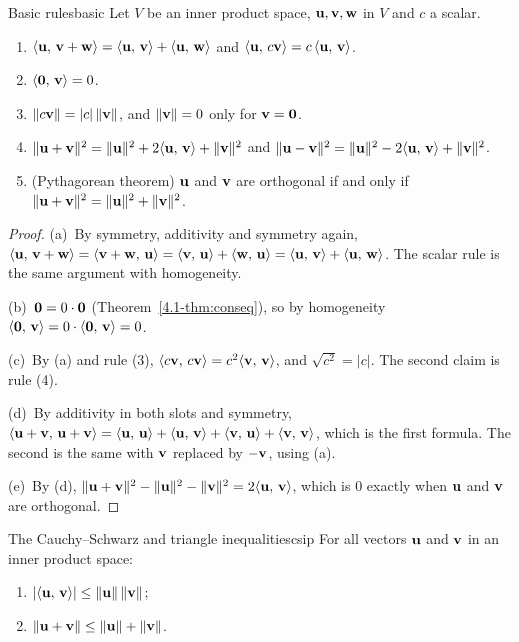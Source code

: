 \documentclass[11pt]{article}
\begin{document}
\begin{thm}{Basic rules}{basic}
Let $V$ be an inner product space, $\mathbf{u},\mathbf{v},\mathbf{w}$ in $V$ and $c$ a scalar.
\begin{enumerate}[label=(\alph*),itemsep=1pt]
  \item $\langle \mathbf{u},\,\mathbf{v}+\mathbf{w}\rangle=\langle \mathbf{u},\,\mathbf{v}\rangle+\langle \mathbf{u},\,\mathbf{w}\rangle$ and $\langle \mathbf{u},\,c\mathbf{v}\rangle=c\,\langle \mathbf{u},\,\mathbf{v}\rangle$.
  \item $\langle \mathbf{0},\,\mathbf{v}\rangle=0$.
  \item $\lVert c\mathbf{v}\rVert=|c|\,\lVert\mathbf{v}\rVert$, and $\lVert\mathbf{v}\rVert=0$ only for $\mathbf{v}=\mathbf{0}$.
  \item $\lVert\mathbf{u}+\mathbf{v}\rVert^2=\lVert\mathbf{u}\rVert^2+2\langle \mathbf{u},\,\mathbf{v}\rangle+\lVert\mathbf{v}\rVert^2$ and $\lVert\mathbf{u}-\mathbf{v}\rVert^2=\lVert\mathbf{u}\rVert^2-2\langle \mathbf{u},\,\mathbf{v}\rangle+\lVert\mathbf{v}\rVert^2$.
  \item (Pythagorean theorem) $\mathbf{u}$ and $\mathbf{v}$ are orthogonal if and only if $\lVert\mathbf{u}+\mathbf{v}\rVert^2=\lVert\mathbf{u}\rVert^2+\lVert\mathbf{v}\rVert^2$.
\end{enumerate}
\end{thm}

\begin{proof}
(a)~By symmetry, additivity and symmetry again, $\langle \mathbf{u},\,\mathbf{v}+\mathbf{w}\rangle=\langle \mathbf{v}+\mathbf{w},\,\mathbf{u}\rangle=\langle \mathbf{v},\,\mathbf{u}\rangle+\langle \mathbf{w},\,\mathbf{u}\rangle=\langle \mathbf{u},\,\mathbf{v}\rangle+\langle \mathbf{u},\,\mathbf{w}\rangle$. The scalar rule is the same argument with homogeneity.

(b)~$\mathbf{0}=0\cdot\mathbf{0}$ (Theorem~\ref{4.1-thm:conseq}), so by homogeneity $\langle \mathbf{0},\,\mathbf{v}\rangle=0\cdot\langle \mathbf{0},\,\mathbf{v}\rangle=0$.

(c)~By (a) and rule (3), $\langle c\mathbf{v},\,c\mathbf{v}\rangle=c^2\langle \mathbf{v},\,\mathbf{v}\rangle$, and $\sqrt{c^2}=|c|$. The second claim is rule (4).

(d)~By additivity in both slots and symmetry, $\langle \mathbf{u}+\mathbf{v},\,\mathbf{u}+\mathbf{v}\rangle=\langle \mathbf{u},\,\mathbf{u}\rangle+\langle \mathbf{u},\,\mathbf{v}\rangle+\langle \mathbf{v},\,\mathbf{u}\rangle+\langle \mathbf{v},\,\mathbf{v}\rangle$, which is the first formula. The second is the same with $\mathbf{v}$ replaced by $-\mathbf{v}$, using (a).

(e)~By (d), $\lVert\mathbf{u}+\mathbf{v}\rVert^2-\lVert\mathbf{u}\rVert^2-\lVert\mathbf{v}\rVert^2=2\langle \mathbf{u},\,\mathbf{v}\rangle$, which is $0$ exactly when $\mathbf{u}$ and $\mathbf{v}$ are orthogonal.
\end{proof}

\begin{thm}{The Cauchy--Schwarz and triangle inequalities}{csip}
For all vectors $\mathbf{u}$ and $\mathbf{v}$ in an inner product space:
\begin{enumerate}[label=(\alph*),itemsep=1pt]
  \item $|\langle \mathbf{u},\,\mathbf{v}\rangle|\le\lVert\mathbf{u}\rVert\,\lVert\mathbf{v}\rVert$;
  \item $\lVert\mathbf{u}+\mathbf{v}\rVert\le\lVert\mathbf{u}\rVert+\lVert\mathbf{v}\rVert$.
\end{enumerate}
\end{thm}
\end{document}
